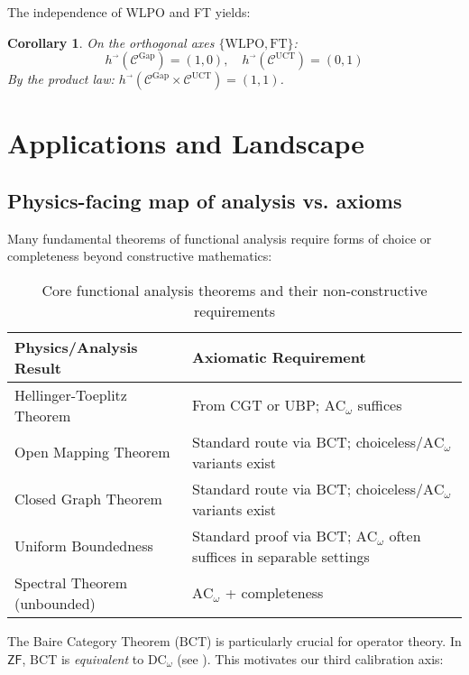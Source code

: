 \documentclass[11pt]{article}
\newtheorem{corollary}[theorem]{Corollary}
\newcommand{\WLPO}{\mathrm{WLPO}}
\newcommand{\FT}{\mathrm{FT}}
\newcommand{\DCw}{\mathrm{DC}_\omega}
\newcommand{\ACw}{\mathrm{AC}_\omega}
\newcommand{\BCT}{\mathrm{BCT}}
\newcommand{\UCT}{\mathrm{UCT}}
\begin{document}
The independence of WLPO and FT yields:

\begin{corollary}
On the orthogonal axes $\{\WLPO, \FT\}$:
\[
h^{\vec{}}(\mathcal{C}^{\text{Gap}}) = (1, 0), \quad h^{\vec{}}(\mathcal{C}^{\UCT}) = (0, 1)
\]
By the product law: $h^{\vec{}}(\mathcal{C}^{\text{Gap}} \times \mathcal{C}^{\UCT}) = (1, 1)$.
\end{corollary}

\section{Applications and Landscape}\label{sec:applications}

\subsection{Physics-facing map of analysis vs. axioms}

Many fundamental theorems of functional analysis require forms of choice or completeness beyond constructive mathematics:

\begin{table}[h]
\centering
\begin{tabular}{ll}
\hline
\textbf{Physics/Analysis Result} & \textbf{Axiomatic Requirement} \\
\hline
Hellinger-Toeplitz Theorem & From CGT or UBP; $\ACw{}$ suffices \\
Open Mapping Theorem & Standard route via BCT; choiceless/$\ACw{}$ variants exist \\
Closed Graph Theorem & Standard route via BCT; choiceless/$\ACw{}$ variants exist \\
Uniform Boundedness & Standard proof via BCT; $\ACw{}$ often suffices in separable settings \\
Spectral Theorem (unbounded) & $\ACw{}$ + completeness \\
\hline
\end{tabular}
\caption{Core functional analysis theorems and their non-constructive requirements}
\label{tab:physics-analysis}
\end{table}

The Baire Category Theorem ($\BCT{}$) is particularly crucial for operator theory. In $\mathsf{ZF}$, $\BCT{}$ is \emph{equivalent} to $\DCw{}$ (see \cite{Blair77}). This motivates our third calibration axis:
\end{document}
